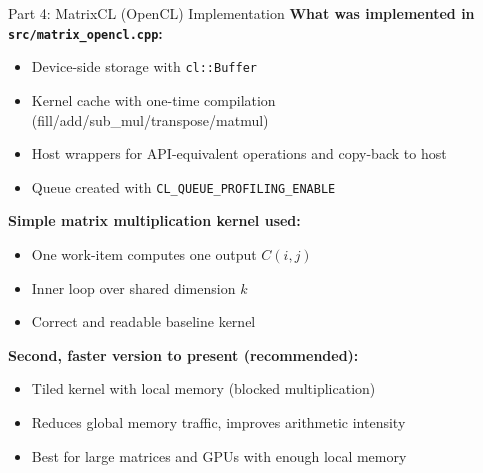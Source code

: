 \documentclass[aspectratio=169]{beamer}
\begin{document}
\begin{frame}{Part 4: MatrixCL (OpenCL) Implementation}
\textbf{What was implemented in \texttt{src/matrix\_opencl.cpp}:}
\begin{itemize}
  \item Device-side storage with \texttt{cl::Buffer}
  \item Kernel cache with one-time compilation (fill/add/sub\_mul/transpose/matmul)
  \item Host wrappers for API-equivalent operations and copy-back to host
  \item Queue created with \texttt{CL\_QUEUE\_PROFILING\_ENABLE}
\end{itemize}

\textbf{Simple matrix multiplication kernel used:}
\begin{itemize}
  \item One work-item computes one output $C(i,j)$
  \item Inner loop over shared dimension $k$
  \item Correct and readable baseline kernel
\end{itemize}

\textbf{Second, faster version to present (recommended):}
\begin{itemize}
  \item Tiled kernel with local memory (blocked multiplication)
  \item Reduces global memory traffic, improves arithmetic intensity
  \item Best for large matrices and GPUs with enough local memory
\end{itemize}
\end{frame}
\end{document}
